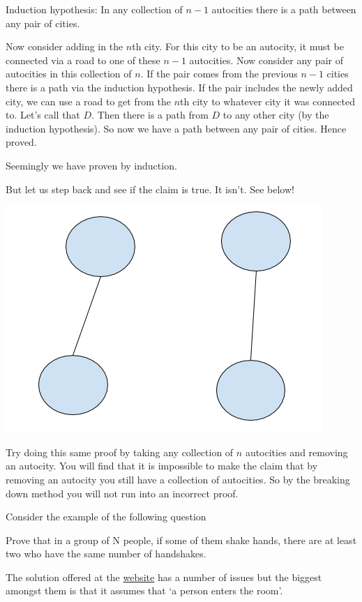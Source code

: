 \documentclass[12pt]{article}
\begin{document}
Induction hypothesis: In any collection of $n-1$ autocities there is a path between any pair of cities.

Now consider adding in the $n$th city. For this city to be an autocity, it must be connected via a road to one of these $n-1$ autocities. Now consider any pair of autocities in this collection of $n$. If the pair comes from the previous $n-1$ cities there is a path via the induction hypothesis. If the pair includes the newly added city, we can use a road to get from the $n$th city to whatever city it was connected to. Let's call that $D$. Then there is a path from $D$ to any other city (by the induction hypothesis). So now we have a path between any pair of cities. Hence proved.

Seemingly we have proven by induction.

But let us step back and see if the claim is true. It isn't. See below!

\includegraphics[scale=0.5]{autocity.png}

Try doing this same proof by taking  any collection of $n$ autocities and removing an autocity. You will find that it is impossible to make the claim that by removing an autocity you still have a collection of autocities. So by the breaking down method you will not run into an incorrect proof.


Consider the example of the following question

\begin{Exercise*}
Prove that in a group of N people,
if some of them shake hands,
there are at least two who have the same number of handshakes. 
\end{Exercise*}

The solution offered at the \href{http://www.gottfriedville.net/mathprob/comb-shakes.html}{website} has a number of issues but the biggest amongst them is that it assumes that `a person enters the room'. 
\end{document}

